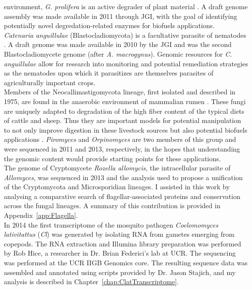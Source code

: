 environment, \textit{G. prolifera} is an active degrader of plant
material \cite{Karling1977}. A draft genome assembly was made available in
2011 through JGI, with the goal of identifying potentially novel
degredation-related enzymes for biofuels applications. \\
\indent \textit{Catenaria anguillulae} (Blastocladiomycota) is a
facultative parasite of nematodes \cite{Deacon1997}. A draft genome
was made available in 2010 by the JGI and was the second
Blastocladiomycete genome (after \textit{A. macrogynus}). Genomic
resources for \textit{C. anguillulae} allow for research into
monitoring and potential remediation strategies as the nematodes upon
which it parasitizes are themselves parasites of agriculturally
important crops.\\
\indent Members of the Neocallimastigomycota lineage, first isolated
and described in 1975, are found in the anaerobic environment of
mammalian rumen \cite{Orpin1975}. These fungi are uniquely adapted to
degradation of the high fiber content of the typical diets of cattle
and sheep. Thus they are important models for potential manipulation
to not only improve digestion in these livestock sources \cite{Ho1995}
but also potential biofuels applications
\cite{Youssef2013,Gruninger2014}. \textit{Piromyces} and \textit{Orpinomyces} are
two members of this group and were sequenced in 2011 and 2013,
respectively, in the hopes that understanding the genomic content
would provide starting points for these applications. \\
\indent The genome of Cryptomycete \textit{Rozella allomycis}, the
intracellular parasite of \textit{Allomyces}, was sequenced in 2013
\cite{James2013} and the analysis used to propose a unification of the
Cryptomycota and Microsporidian lineages. I assisted in this work 
by analysing a comparative search of flagellar-associated proteins
and conservation across the fungal lineages. A summary of this contribution
is provided in Appendix~\ref{app:Flagella}.\\
\indent In 2014 the first transcriptome of the mosquito pathogen
\textit{Coelomomyces lativitattus} (\textit{Cl}) was generated by
isolating RNA from gametes emerging from copepods. The RNA extraction
and Illumina library preparation was performed by Rob Hice, a
researcher in Dr. Brian Federici's lab at UCR. The sequencing was
performed at the UCR IIGB Genomics core. The resulting sequence data
was assembled and annotated using scripts provided by Dr. Jason
Stajich, and my analysis is described in
Chapter~\ref{chap:ClatTranscriptome}.\\
